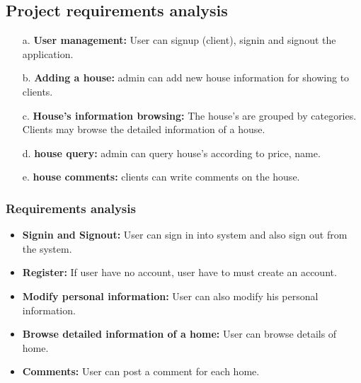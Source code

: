 \documentclass[12pt,a4paper]{article}
\newcommand\tab[1][.7cm]{\hspace*{#1}}
\begin{document}
		\subsection{Project requirements analysis}
		\tab{Project requirements analysis are important stage in the system development. It
	determines the functions of the whole application integrity and stability. Software requirements
	analysis is an ongoing process of understanding and progressive refinement. Through
	requirements analysis, design functions of the management system as below-}
				\begin{itemize}
					\item[a.]\textbf{User management:} User can signup (client), signin and signout the application.
					\item[b.]\textbf{Adding a house:} admin can add new house information for showing to clients.
					\item[c.]\textbf{House's information browsing:} The house's are grouped by categories. Clients may
	browse the detailed information of a house.
					\item[d.]\textbf{house query:} admin can query house's according to price, name.
					\item[e.]\textbf{house comments:} clients can write comments on the house.
				\end{itemize}
			\subsubsection{Requirements analysis}
			\tab{The in-front management system is the user visits home list and
	signup user as client. Only the admin can manage his/her searching potion about the
	specific home, comment and price. So in this part, specific functions are described as
	below:}	\begin{itemize}
					\item {\bfseries Signin and Signout:} User can sign in into system and also sign out from the system.
					\item {\bfseries Register:} If user have no account, user have to must create an account.
					\item {\bfseries Modify personal information:} User can also modify his personal information.
					\item {\bfseries Browse detailed information of a home:} User can browse details of home.
					\item {\bfseries Comments:} User can post a comment for each home.
				\end{itemize}
\end{document}
